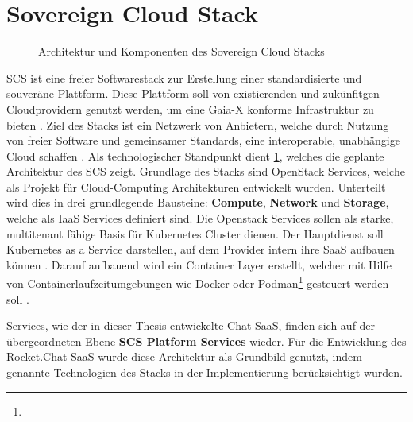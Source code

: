 \section{Sovereign Cloud Stack}
\label{sec:gaia-x-einbettung:scs}

\begin{figure}[h]
  \raggedleft
  \caption{Architektur und Komponenten des Sovereign Cloud Stacks}
  \label{fig:scs_architecture}
\end{figure}

\ac{SCS} ist eine freier Softwarestack zur Erstellung einer standardisierte und souveräne Plattform.
Diese Plattform soll von existierenden und zukünfitgen Cloudprovidern genutzt werden, um eine Gaia-X konforme Infrastruktur zu bieten \cite{scs}.
Ziel des Stacks ist ein Netzwerk von Anbietern, welche durch Nutzung von freier Software und gemeinsamer Standards,
eine interoperable, unabhängige Cloud schaffen \cite{Kagermann2021}.
Als technologischer Standpunkt dient \ref{fig:scs_architecture}, welches die geplante Architektur des \ac{SCS} zeigt. 
Grundlage des Stacks sind OpenStack Services, welche als Projekt für Cloud-Computing Architekturen entwickelt wurden.
Unterteilt wird dies in drei grundlegende Bausteine: \textbf{Compute}, \textbf{Network} und \textbf{Storage},
welche als \ac{IaaS} Services definiert sind.
Die Openstack Services sollen als starke, multitenant fähige Basis für Kubernetes Cluster dienen. 
Der Hauptdienst soll Kubernetes as a Service darstellen, auf dem Provider intern ihre \ac{SaaS} aufbauen können \cite{scs}.
Darauf aufbauend wird ein Container Layer erstellt, welcher mit Hilfe von Containerlaufzeitumgebungen
wie Docker oder 
Podman\footnote{}
gesteuert werden soll \cite{scs}.

Services, wie der in dieser Thesis entwickelte Chat \ac{SaaS}, finden sich auf der übergeordneten Ebene \textbf{SCS Platform Services} wieder.
Für die Entwicklung des Rocket.Chat \ac{SaaS} wurde diese Architektur als Grundbild genutzt, indem 
genannte Technologien des Stacks in der Implementierung berücksichtigt wurden.